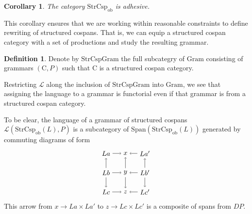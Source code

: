 \documentclass{amsart}
\newcommand{\ob}{_{ \text{ob} }}
\newcommand{\C}{\cat{C}}
\newcommand{\Gram}{\cat{Gram}}
\newcommand{\StrCspGram}{\cat{StrCspGram}}
\newcommand{\Span}[1]{\cat{Span}(#1)}
\newcommand{\StrCsp}{\cat{StrCsp}}
\newcommand{\Lang}{\mathcal{L}}
\newcommand{\cat}[1]{\mathrm{#1}}
\newcommand{\csp}[3]{#2 \to #1 \times #3}
\newtheorem{corollary}[theorem]{Corollary}
\theoremstyle{remark}
\theoremstyle{definition}
\newtheorem{definition}[theorem]{Definition}
\begin{document}
\begin{corollary} \label{thm:dpo_category-StrCsp-adhsv}
  The category $ \StrCsp\ob $ is adhesive.
\end{corollary}

This corollary ensures that we are working within reasonable
constraints to define rewriting of structured cospans. That is, we can
equip a structured cospan category with a set of productions and study
the resulting grammar.

\begin{definition}

  Denote by $ \StrCspGram $ the full subcategry of $ \Gram $
  consisting of grammars $ ( \C , P ) $ such that $ \C $ is a
  structured cospan category.
  
\end{definition}

Restricting $ \Lang $ along the inclusion of $ \StrCspGram $ into
$ \Gram $, we see that assigning the language to a grammar is
functorial even if that grammar is from a structured cospan
category.

To be clear, the language of a grammar of structured cospans
$ \Lang ( \StrCsp\ob (L) , P ) $ is a subcategory of
$ \Span{\StrCsp\ob (L)} $ generated by commuting diagrams of form
%
\[
  \begin{tikzpicture}
    \node (1) at (0,2) {\( La \)};
    \node (2) at (1,2) {\( x \)};
    \node (3) at (2,2) {\( La' \)};
    \node (4) at (0,1) {\( Lb \)};
    \node (5) at (1,1) {\( y \)};
    \node (6) at (2,1) {\( Lb' \)};
    \node (7) at (0,0) {\( Lc \)};
    \node (8) at (1,0) {\( z \)};
    \node (9) at (2,0) {\( Lc' \)};
    \draw [->] (1) to node [] {\scriptsize{\(  \)}} (2);
    \draw [->] (3) to node [] {\scriptsize{\(  \)}} (2);
    \draw [->] (4) to node [] {\scriptsize{\(  \)}} (5);
    \draw [->] (6) to node [] {\scriptsize{\(  \)}} (5);
    \draw [->] (7) to node [] {\scriptsize{\(  \)}} (8);
    \draw [->] (9) to node [] {\scriptsize{\(  \)}} (8);
    \draw [->] (4) to node [] {\scriptsize{\(  \)}} (1);
    \draw [->] (4) to node [] {\scriptsize{\(  \)}} (7);
    \draw [->] (5) to node [] {\scriptsize{\(  \)}} (2);
    \draw [->] (5) to node [] {\scriptsize{\(  \)}} (8);
    \draw [->] (6) to node [] {\scriptsize{\(  \)}} (3);
    \draw [->] (6) to node [] {\scriptsize{\(  \)}} (9); 
  \end{tikzpicture}
\]
% 
This arrow from $ \csp{La}{x}{La'}$ to $ \csp{Lc}{z}{Lc'} $ is a
composite of spans from $ DP $.
\end{document}

